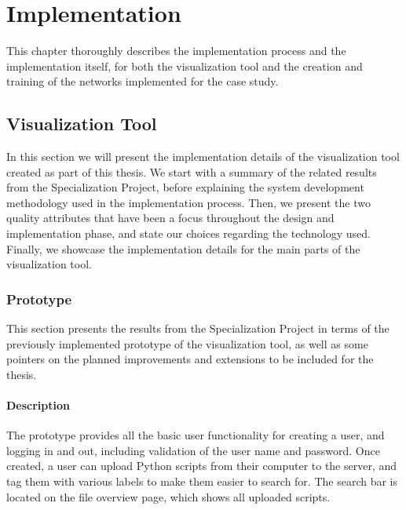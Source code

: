 
\chapter{Implementation}\label{implementation-chap}

This chapter thoroughly describes the implementation process and the implementation itself, for both the visualization tool and the creation and training of the networks implemented for the case study.

\section{Visualization Tool}

In this section we will present the implementation details of the visualization tool created as part of this thesis. We start with a summary of the related results from the Specialization Project, before explaining the system development methodology used in the implementation process. Then, we present the two quality attributes that have been a focus throughout the design and implementation phase, and state our choices regarding the technology used. Finally, we showcase the implementation details for the main parts of the visualization tool.

\subsection{Prototype}

This section presents the results from the Specialization Project in terms of the previously implemented prototype of the visualization tool, as well as some pointers on the planned improvements and extensions to be included for the thesis.

\subsubsection{Description}


\noindent The prototype provides all the basic user functionality for creating a user, and logging in and out, including validation of the user name and password. Once created, a user can upload Python scripts from their computer to the server, and tag them with various labels to make them easier to search for. The search bar is located on the file overview page, which shows all uploaded scripts. \\

